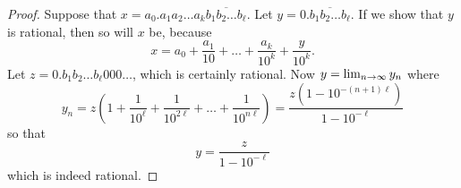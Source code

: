 \documentclass[11pt,dvipsnames]{book}
\numberwithin{equation}{section} %
\numberwithin{figure}{section} %
\numberwithin{table}{section} %
\begin{document}
\begin{proof}
Suppose that $x=a_{0}.a_{1}a_{2}\ldots a_{k} \overline{b_{1}b_{2}\ldots b_{\ell}}$. Let $
 y= 0.\overline{b_{1}b_{2}\ldots b_{\ell}}$.
 If we show that $y$ is rational, then so will $x$ be, because
 \[x = a_0 + \frac{a_1}{10} + \dots + \frac{a_k}{10^k} + \frac{y}{10^{k}}.
 \]
 Let $z = 0.{b_{1}b_{2}\ldots b_{\ell}}000\ldots$, which is certainly rational. Now
 $y = \lim_{n\rightarrow\infty} y_n$ where
 \[ y_n = z\left(1 + \frac{1}{10^{\ell}} + \frac{1}{10^{2\ell}} + \dots + \frac{1}{10^{n\ell}}\right) = \frac{z\left(1 - 10^{-(n+1)\ell}\right)}{1- 10^{-\ell}} \]
 so that 
 \[y = \frac{z}{1- 10^{-\ell}}\]
which is indeed rational.
 
% 



 
\end{proof}
\end{document}
